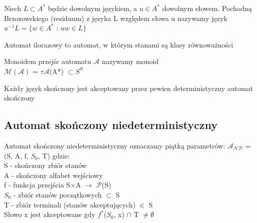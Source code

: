 \documentclass[12pt]{article}
\begin{document}
    	\begin{definition}
    	Niech $L \subset  A^{*}$ będzie dowolnym językiem, a $u \in A^{*}$ dowolnym słowem.
	Pochodną Brzozowskiego (residuum) z języka L względem słowa u nazywamy język \\
	$u^{-1}L = \{w \in A^{*}$  :  $uw \in L \}$
    	\end{definition}

    	\begin{definition}
    	Automat ilorazowy to automat, w którym stanami są klasy równoważności
    	\end{definition}

    	\begin{definition}
    	Monoidem przejśc automatu $\mathcal{A}$ nazywamy monoid \\
    	$\mathcal{M(A)}$ = $\tau \mathcal{A}$(A*) $\subset S^{S}$
    	\end{definition}

    	\begin{definition}
    	Każdy język skończony jest akceptowany przez pewien deterministyczny automat skończony
    	\end{definition}

    \subsection{Automat skończony niedeterministyczny}
	\begin{definition}
    		Automat skończony niedeterministyczny oznaczamy piątką parametrów: $\mathcal{A_{ND}}$ = (S, A, f, $S_{0}$, T) gdzie: \\
    			S - skończony zbiór stanów \\
    			A - skończony alfabet wejściowy \\
    			f - funkcja przejścia S$\times$A $\rightarrow$ $\mathcal{P}$(S) \\
    			$S_{0}$ - zbiór stanów początkowych $\subset$ S\\
    			T - zbiór terminali (stanów akceptujących) $\in$ S \\

	Słowo x jest akceptowane gdy $f^{*}$($S_{0}$, x) $\cap$ T $\neq \emptyset$
    \end{definition}
\end{document}
